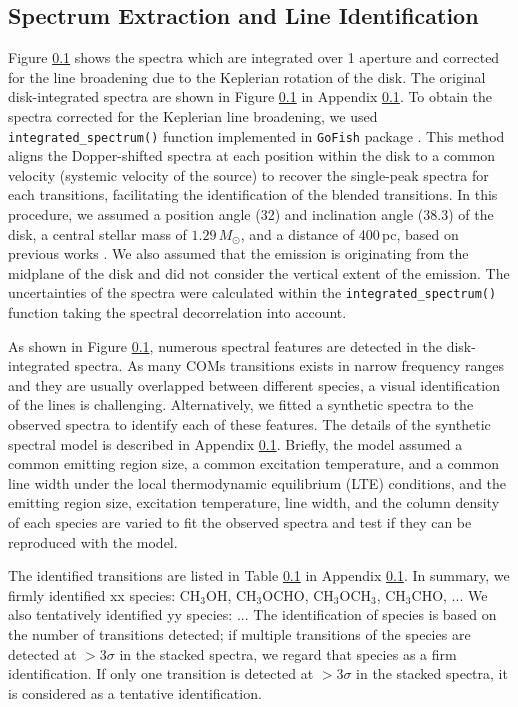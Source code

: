\documentclass[linenumbers, twocolumn, times]{aastex631}
\newcommand{\methanol}{CH$_3$OH\xspace}
\newcommand{\acetaldehyde}{CH$_3$CHO\xspace}
\newcommand{\methylformate}{CH$_3$OCHO\xspace}
\newcommand{\dimethylether}{CH$_3$OCH$_3$\xspace}
\begin{document}
\subsection{Spectrum Extraction and Line Identification}
Figure \ref{} shows the spectra which are integrated over 1 aperture and corrected for the line broadening due to the Keplerian rotation of the disk. The original disk-integrated spectra are shown in Figure \ref{} in Appendix \ref{}. To obtain the spectra corrected for the Keplerian line broadening, we used \texttt{integrated\_spectrum()} function implemented in \texttt{GoFish} package \citep{GoFish}. This method aligns the Dopper-shifted spectra at each position within the disk to a common velocity (systemic velocity of the source) to recover the single-peak spectra for each transitions, facilitating the identification of the blended transitions. In this procedure, we assumed a position angle (32\arcdeg) and inclination angle (38.3\arcdeg) of the disk, a central stellar mass of $1.29\,M_\odot$, and a distance of 400\,pc, based on previous works \citep{Cieza2016, Tobin2023}. We also assumed that the emission is originating from the midplane of the disk and did not consider the vertical extent of the emission. The uncertainties of the spectra were calculated within the \texttt{integrated\_spectrum()} function taking the spectral decorrelation \citep{Yen2016} into account.

As shown in Figure \ref{}, numerous spectral features are detected in the disk-integrated spectra. As many COMs transitions exists in narrow frequency ranges and they are usually overlapped between different species, a visual identification of the lines is challenging. Alternatively, we fitted a synthetic spectra to the observed spectra to identify each of these features. The details of the synthetic spectral model is described in Appendix \ref{}. Briefly, the model assumed a common emitting region size, a common excitation temperature, and a common line width under the local thermodynamic equilibrium (LTE) conditions, and the emitting region size, excitation temperature, line width, and the column density of each species are varied to fit the observed spectra and test if they can be reproduced with the model. 

The identified transitions are listed in Table \ref{} in Appendix \ref{}. In summary, we firmly identified xx species: \methanol, \methylformate, \dimethylether, \acetaldehyde, ... We also tentatively identified yy species: ... The identification of species is based on the number of transitions detected; if multiple transitions of the species are detected at $>3\sigma$ in the stacked spectra, we regard that species as a firm identification. If only one transition is detected at $>3\sigma$ in the stacked spectra, it is considered as a tentative identification.
\end{document}
